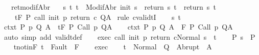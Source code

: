 \begin{isabellebody}
\ \ \ ret{\isacharunderscore}modifAbr{\isacharcolon}\ \isanewline
\ \ {\isachardoublequoteopen}{\isasymforall}s\ t{\isachardot}\ t\ {\isasymin}\ ModifAbr\ {\isacharparenleft}init\ s{\isacharparenright}\ {\isasymlongrightarrow}\ return{\isacharprime}\ s\ t\ {\isacharequal}\ return\ s\ t{\isachardoublequoteclose}\isanewline
\ \ \ {\isachardoublequoteopen}{\isasymGamma}{\isacharcomma}{\isasymTheta}\ {\isasymTurnstile}\isactrlsub t\isactrlbsub {\isacharslash}F\isactrlesub \ P\ {\isacharparenleft}call\ init\ p\ return\ c{\isacharparenright}\ Q{\isacharcomma}A{\isachardoublequoteclose}\isanewline
%
\isadelimproof
%
\endisadelimproof
%
\isatagproof
{}\isamarkupfalse%
\ {\isacharparenleft}rule\ cvalidtI{\isacharparenright}\isanewline
\ \ \isamarkupfalse%
\ s\ t\isanewline
\ \ \isamarkupfalse%
\ ctxt{\isacharcolon}\ {\isachardoublequoteopen}{\isasymforall}{\isacharparenleft}P{\isacharcomma}\ p{\isacharcomma}\ Q{\isacharcomma}\ A{\isacharparenright}{\isasymin}{\isasymTheta}{\isachardot}\ {\isasymGamma}\ {\isasymTurnstile}\isactrlsub t\isactrlbsub {\isacharslash}F\isactrlesub \ P\ {\isacharparenleft}Call\ p{\isacharparenright}\ Q{\isacharcomma}A{\isachardoublequoteclose}\isanewline
\ \ \isamarkupfalse%
\ ctxt{\isacharprime}{\isacharcolon}\ {\isachardoublequoteopen}{\isasymforall}{\isacharparenleft}P{\isacharcomma}\ p{\isacharcomma}\ Q{\isacharcomma}\ A{\isacharparenright}{\isasymin}{\isasymTheta}{\isachardot}\ {\isasymGamma}\ {\isasymTurnstile}\isactrlbsub {\isacharslash}F\isactrlesub \ P\ {\isacharparenleft}Call\ p{\isacharparenright}\ Q{\isacharcomma}A{\isachardoublequoteclose}\ \isanewline
\ \ \ \ \isamarkupfalse%
\ {\isacharparenleft}auto\ simp\ add{\isacharcolon}\ validt{\isacharunderscore}def{\isacharparenright}\isanewline
\ \ \isamarkupfalse%
\ exec{\isacharcolon}\ {\isachardoublequoteopen}{\isasymGamma}{\isasymturnstile}{\isasymlangle}call\ init\ p\ return\ c{\isacharcomma}Normal\ s{\isasymrangle}\ {\isasymRightarrow}\ t{\isachardoublequoteclose}\isanewline
\ \ \isamarkupfalse%
\ P{\isacharcolon}\ {\isachardoublequoteopen}s\ {\isasymin}\ P{\isachardoublequoteclose}\isanewline
\ \ \isamarkupfalse%
\ t{\isacharunderscore}notin{\isacharunderscore}F{\isacharcolon}\ {\isachardoublequoteopen}t\ {\isasymnotin}\ Fault\ {\isacharbackquote}\ F{\isachardoublequoteclose}\isanewline
\ \ \isamarkupfalse%
\ exec\isanewline
\ \ \isamarkupfalse%
\ {\isachardoublequoteopen}t\ {\isasymin}\ Normal\ {\isacharbackquote}\ Q\ {\isasymunion}\ Abrupt\ {\isacharbackquote}\ A{\isachardoublequoteclose}\isanewline

\end{isabellebody}
